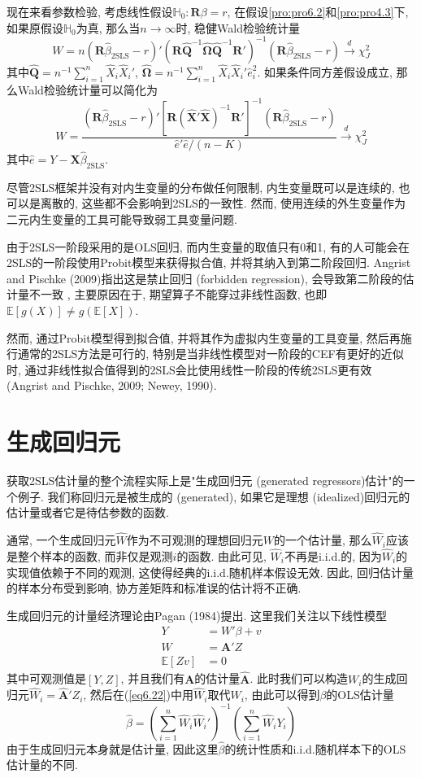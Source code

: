 \documentclass[cn, 12pt, math=mtpro2, bibstyle=apa, blue, twocol]{elegantbook}
\newcommand{\RH}{\mathbold{R}}
\newcommand{\E}{\mathbb{E}}
\newcommand{\Q}{\mathbold{Q}}
\newcommand{\X}{\mathbold{X}}
\newcommand{\hb}{\hat{\beta}}
\newcommand{\HH}{\mathbb{H}}
\newcommand{\BO}{\mathbold{\Omega}}
\begin{document}
现在来看参数检验, 考虑线性假设$\HH_0: \RH\beta=r$, 在假设\ref{pro:pro6.2}和\ref{pro:pro4.3}下, 如果原假设$\HH_0$为真, 那么当$n\to\infty$时, 稳健Wald检验统计量
$$W=n(\RH\hat{\beta}_{\text{2SLS}}-r)'\left(\RH\hat{\Q}^{-1}\hat{\BO}\hat{\Q}^{-1}\RH'\right)^{-1}(\RH\hat{\beta}_{\text{2SLS}}-r)\xrightarrow{d}\chi^2_J$$
其中$\hat{\Q}=n^{-1}\sum_{i=1}^{n}\hat{X}_i\hat{X}_i'$, $\hat{\BO}=n^{-1}\sum_{i=1}^{n}\hat{X}_i\hat{X}_i'\hat{e}_i^2$. 如果条件同方差假设成立, 那么Wald检验统计量可以简化为
$$W=\frac{(\RH\hb_{\text{2SLS}}-r)'[\RH(\hat{\X}'\hat{\X})^{-1}\RH']^{-1}(\RH\hb_{\text{2SLS}}-r)}{\hat{e}'\hat{e}/(n-K)}\xrightarrow{d}\chi_J^2$$
其中$\hat{e}=Y-\X\hb_{\text{2SLS}}$.

尽管2SLS框架并没有对内生变量的分布做任何限制, 内生变量既可以是连续的, 也可以是离散的, 这些都不会影响到2SLS的一致性. 然而, 使用连续的外生变量作为二元内生变量的工具可能导致弱工具变量问题.

由于2SLS一阶段采用的是OLS回归, 而内生变量的取值只有0和1, 有的人可能会在2SLS的一阶段使用Probit模型来获得拟合值, 并将其纳入到第二阶段回归. Angrist and Pischke (2009)指出这是禁止回归 (forbidden regression), 会导致第二阶段的估计量不一致 , 主要原因在于, 期望算子不能穿过非线性函数, 也即$\E[g(X)]\neq g(\E[X])$.

然而, 通过Probit模型得到拟合值, 并将其作为虚拟内生变量的工具变量, 然后再施行通常的2SLS方法是可行的, 特别是当非线性模型对一阶段的CEF有更好的近似时, 通过非线性拟合值得到的2SLS会比使用线性一阶段的传统2SLS更有效 (Angrist and Pischke, 2009; Newey, 1990).
\newpage
\section{生成回归元}
获取2SLS估计量的整个流程实际上是"生成回归元 (generated regressors)估计"的一个例子. 我们称回归元是被生成的 (generated), 如果它是理想 (idealized)回归元的估计量或者它是待估参数的函数.

通常, 一个生成回归元$\hat{W}$作为不可观测的理想回归元$W$的一个估计量, 那么$\hat{W}_i$应该是整个样本的函数, 而非仅是观测$i$的函数. 由此可见, $\hat{W}_i$不再是i.i.d.的, 因为$\hat{W}_i$的实现值依赖于不同的观测, 这使得经典的i.i.d.随机样本假设无效. 因此, 回归估计量的样本分布受到影响, 协方差矩阵和标准误的估计将不正确.

生成回归元的计量经济理论由Pagan (1984)提出. 这里我们关注以下线性模型
\begin{align}
Y&=W'\beta+v \label{eq6.22} \\
W&=\mathbold{A}'Z \nonumber \\
\E[Zv]&=0 \nonumber
\end{align}
其中可观测值是$[Y,Z]$, 并且我们有$\mathbold{A}$的估计量$\hat{\mathbold{A}}$. 此时我们可以构造$W_i$的生成回归元$\hat{W}_i=\hat{\mathbold{A}}'Z_i$, 然后在(\ref{eq6.22})中用$\hat{W}_i$取代$W_i$, 由此可以得到$\beta$的OLS估计量
\begin{equation}\label{eq6.23}
  \hb=\left(\sum_{i=1}^{n}\hat{W}_i\hat{W}_i'\right)^{-1}\left(\sum_{i=1}^{n}\hat{W}_iY_i\right)
\end{equation}
由于生成回归元本身就是估计量, 因此这里$\hb$的统计性质和i.i.d.随机样本下的OLS估计量的不同.
\end{document}
